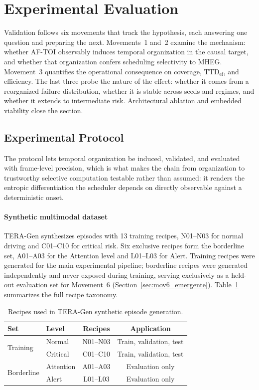 \documentclass[a4paper,fleqn]{cas-dc}
\newcommand{\TERAGen}{\mbox{TERA-Gen}\xspace}
\newcommand{\AFTOI}{\mbox{AF-TOI}\xspace}
\newcommand{\MHEG}{\mbox{MHEG}\xspace}
\begin{document}
\section{Experimental Evaluation}
\label{sec:avaliacao}
Validation follows six movements that track the hypothesis, each answering one
question and preparing the next. Movements~1 and~2 examine the mechanism:
whether \AFTOI observably induces temporal organization in the causal target,
and whether that organization confers scheduling selectivity to \MHEG.
Movement~3 quantifies the operational consequence on coverage,
$\mathrm{TTD}_{\mathrm{ef}}$, and efficiency. The last three probe the nature of
the effect: whether it comes from a reorganized failure distribution, whether it
is stable across seeds and regimes, and whether it extends to intermediate risk.
Architectural ablation and embedded viability close the section.
\subsection{Experimental Protocol}
\label{sec:protocolo}
The protocol lets temporal organization be induced, validated, and evaluated with frame-level precision, which is what makes the chain from organization to trustworthy selective computation testable rather than assumed: it renders the entropic differentiation the scheduler depends on directly observable against a deterministic onset.
\paragraph{Synthetic multimodal dataset}
\TERAGen synthesizes episodes with 13 training recipes, N01--N03 for
normal driving and C01--C10 for critical risk. Six exclusive recipes
form the borderline set, A01--A03 for the Attention level and L01--L03
for Alert. Training recipes were generated for the main experimental
pipeline; borderline recipes were generated independently and never
exposed during training, serving exclusively as a held-out evaluation
set for Movement~6 (Section~\ref{sec:mov6_emergente}).
Table~\ref{tab:receitas} summarizes the full recipe taxonomy.
\begin{table}[!tbp]
\centering
\caption{Recipes used in \mbox{TERA-Gen} synthetic episode generation.}
\label{tab:receitas}
\footnotesize
\setlength{\tabcolsep}{4pt}
\renewcommand{\arraystretch}{1.15}
\begin{tabular}{l l c c}
\toprule
\textbf{Set} & \textbf{Level}
  & \textbf{Recipes} & \textbf{Application} \\
\midrule
\multirow{2}{*}{Training} & Normal   & N01--N03 & Train, validation, test \\
                          & Critical & C01--C10 & Train, validation, test \\
\midrule
\multirow{2}{*}{Borderline} & Attention & A01--A03 & Evaluation only \\
                            & Alert     & L01--L03 & Evaluation only \\
\bottomrule
\end{tabular}
\end{table}
\end{document}
